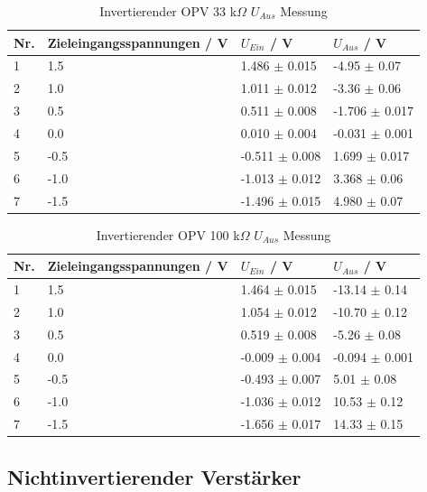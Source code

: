 \documentclass[12pt,a4paper,twoside]{article}
\begin{document}
\begin{table}[H]
    \centering
    \caption{Invertierender OPV 33 k$\Omega$ $U_{Aus}$ Messung}
    \label{tab:IoVerstärkungenGemessen33}
    \begin{tabular}{| l | l | l | l |}
        \hline
        Nr. & Zieleingangsspannungen / V & $U_{Ein}$ / V & $U_{Aus}$ / V \\
        \hline
        1 &  1.5 &  1.486 $\pm$ 0.015 & -4.95  $\pm$  0.07 \\
        2 &  1.0 &  1.011 $\pm$ 0.012 & -3.36  $\pm$  0.06 \\
        3 &  0.5 &  0.511 $\pm$ 0.008 & -1.706 $\pm$ 0.017 \\
        4 &  0.0 &  0.010 $\pm$ 0.004 & -0.031 $\pm$ 0.001 \\
        5 & -0.5 & -0.511 $\pm$ 0.008 &  1.699 $\pm$ 0.017 \\
        6 & -1.0 & -1.013 $\pm$ 0.012 &  3.368 $\pm$ 0.06  \\
        7 & -1.5 & -1.496 $\pm$ 0.015 &  4.980 $\pm$ 0.07  \\
        \hline
    \end{tabular}
\end{table}

\begin{table}[H]
    \centering
    \caption{Invertierender OPV 100 k$\Omega$ $U_{Aus}$ Messung}
    \label{tab:IoVerstärkungenGemessen100}
    \begin{tabular}{| l | l | l | l |}
        \hline
        Nr. & Zieleingangsspannungen / V & $U_{Ein}$ / V & $U_{Aus}$ / V \\
        \hline
        1 &  1.5 &  1.464 $\pm$ 0.015 & -13.14  $\pm$ 0.14  \\
        2 &  1.0 &  1.054 $\pm$ 0.012 & -10.70  $\pm$ 0.12  \\
        3 &  0.5 &  0.519 $\pm$ 0.008 &  -5.26  $\pm$ 0.08  \\
        4 &  0.0 & -0.009 $\pm$ 0.004 &  -0.094 $\pm$ 0.001 \\
        5 & -0.5 & -0.493 $\pm$ 0.007 &   5.01  $\pm$ 0.08  \\
        6 & -1.0 & -1.036 $\pm$ 0.012 &  10.53  $\pm$ 0.12  \\
        7 & -1.5 & -1.656 $\pm$ 0.017 &  14.33  $\pm$ 0.15  \\
        \hline
    \end{tabular}
\end{table}


\subsection{Nichtinvertierender Verstärker}
\end{document}
